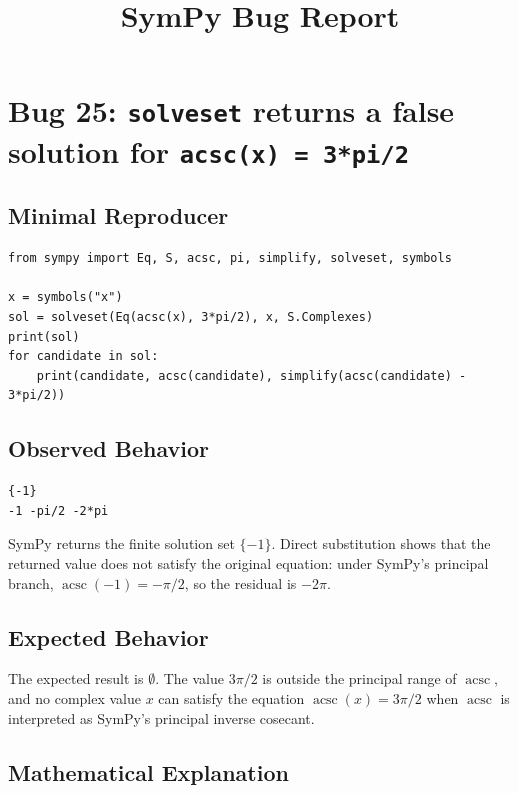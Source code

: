 \documentclass[11pt]{article}
\title{SymPy Bug Report}
\date{}
\begin{document}
\author{}
\maketitle

\section{Bug 25: \texttt{solveset} returns a false solution for \texttt{acsc(x) = 3*pi/2}}

\subsection{Minimal Reproducer}

\medskip

\begin{lstlisting}[style=bugpython]
from sympy import Eq, S, acsc, pi, simplify, solveset, symbols

x = symbols("x")
sol = solveset(Eq(acsc(x), 3*pi/2), x, S.Complexes)
print(sol)
for candidate in sol:
    print(candidate, acsc(candidate), simplify(acsc(candidate) - 3*pi/2))
\end{lstlisting}

\subsection{Observed Behavior}

\medskip

\begin{lstlisting}[style=bugpython]
{-1}
-1 -pi/2 -2*pi
\end{lstlisting}

SymPy returns the finite solution set \(\{-1\}\). Direct substitution shows that the returned value does not satisfy the original equation: under SymPy's principal branch, \(\operatorname{acsc}(-1)=-\pi/2\), so the residual is \(-2\pi\).

\subsection{Expected Behavior}

The expected result is \(\emptyset\). The value \(3\pi/2\) is outside the principal range of \(\operatorname{acsc}\), and no complex value \(x\) can satisfy the equation \(\operatorname{acsc}(x)=3\pi/2\) when \(\operatorname{acsc}\) is interpreted as SymPy's principal inverse cosecant.

\subsection{Mathematical Explanation}
\end{document}
